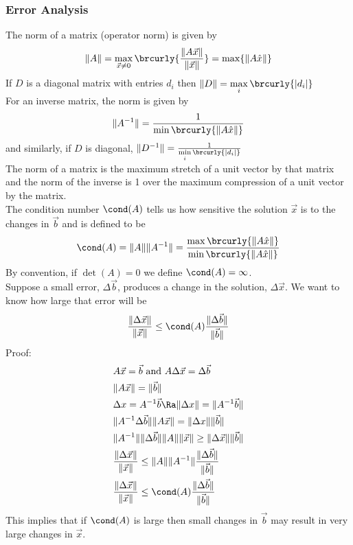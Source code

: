 \subsubsection{Error Analysis}
The norm of a matrix (operator norm) is given by
$$\|A\|=\max_{\vec{x}\neq0}\brcurly{\frac{\|A\vec{x}\|}{\|\vec{x}\|}}=\max\{\|A\hat{x}\|\}$$
If $D$ is a diagonal matrix with entries $d_i$ then $\|D\|=\max\limits_i\brcurly{|d_i|}$\\
For an inverse matrix, the norm is given by
$$\|A^{-1}\|=\frac{1}{\min\brcurly{\|A\hat{x}\|}}$$
and similarly, if $D$ is diagonal, $\|D^{-1}\|=\frac{1}{\min\limits_i\brcurly{|d_i|}}$\\
The norm of a matrix is the maximum stretch of a unit vector by that matrix and the norm of the inverse is 1 over the maximum compression of a unit vector by the matrix.\\
The condition number $\cond(A)$ tells us how sensitive the solution $\vec{x}$ is to the changes in $\vec{b}$ and is defined to be
$$\cond(A)=\|A\|\|A^{-1}\|=\frac{\max\brcurly{\|A\hat{x}\|}}{\min\brcurly{\|A\hat{x}\|}}$$
By convention, if $\det(A)=0$ we define $\cond(A)=\infty$.\\
Suppose a small error, $\Delta \vec{b}$, produces a change in the solution, $\Delta \vec{x}$. We want to know how large that error will be
$$\frac{\|\Delta \vec{x}\|}{\|\vec{x}\|}\leq\cond(A)\frac{\|\Delta\vec{b}\|}{\|\vec{b}\|}$$
Proof:
\begin{align*}
    &A\vec{x}=\vec{b}\text{ and }A\Delta\vec{x}=\Delta\vec{b}\\
    &\|A\vec{x}\|=\|\vec{b}\|\\
    &\Delta x=A^{-1}\vec{b}\Ra \|\Delta x\|=\|A^{-1}\vec{b}\|\\
    &\|A^{-1}\Delta\vec{b}\|\|A\vec{x}\|=\|\Delta x\|\|\vec{b}\|\\
    &\|A^{-1}\|\|\Delta \vec{b}\|\|A\|\|\vec{x}\|\geq\|\Delta\vec{x}\|\|\vec{b}\|\\
    &\frac{\|\Delta\vec{x} \|}{\|\vec{x}\|}\leq\|A\|\|A^{-1}\|\frac{\|\Delta\vec{b}\|}{\|\vec{b}\|}\\
    &\frac{\|\Delta \vec{x}\|}{\|\vec{x}\|}\leq\cond(A)\frac{\|\Delta\vec{b}\|}{\|\vec{b}\|}
\end{align*}
This implies that if $\cond(A)$ is large then small changes in $\vec{b}$ may result in very large changes in $\vec{x}$.

